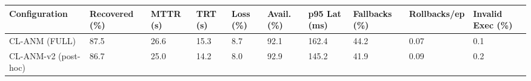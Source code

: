 \begin{tabular}{llllllllll}
\toprule
Configuration & Recovered (\%) & MTTR (s) & TRT (s) & Loss (\%) & Avail. (\%) & p95 Lat (ms) & Fallbacks (\%) & Rollbacks/ep & Invalid Exec (\%) \\
\midrule
CL-ANM (FULL) & 87.5 & 26.6 & 15.3 & 8.7 & 92.1 & 162.4 & 44.2 & 0.07 & 0.1 \\
CL-ANM-v2 (post-hoc) & 86.7 & 25.0 & 14.2 & 8.0 & 92.9 & 145.2 & 41.9 & 0.09 & 0.2 \\
\bottomrule
\end{tabular}
